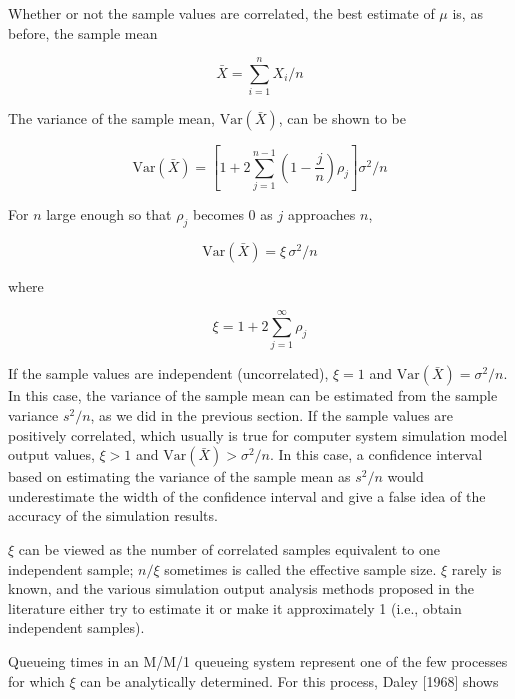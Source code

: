 Whether or not the sample values are correlated, the best estimate of $\mu$ is,
as before, the sample mean

\begin{equation}
\bar{X} = \sum_{i=1}^{n} X_i / n
\label{eq:output-mean-x}
\end{equation}

The variance of the sample mean, $\mathrm{Var}(\bar{X})$, can be shown to be

\begin{equation}
\mathrm{Var}(\bar{X}) =
\left[1 + 2 \sum_{j=1}^{n-1} \left(1 - \frac{j}{n}\right) \rho_j \right]
\sigma^2 / n
\label{eq:output-variance-mean}
\end{equation}

For $n$ large enough so that $\rho_j$ becomes 0 as $j$ approaches $n$,

\begin{equation}
\mathrm{Var}(\bar{X}) = \xi \, \sigma^2 / n
\label{eq:output-variance-mean-xi}
\end{equation}

where

\begin{equation}
\xi = 1 + 2 \sum_{j=1}^{\infty} \rho_j
\label{eq:output-xi}
\end{equation}

If the sample values are independent (uncorrelated), $\xi = 1$ and
$\mathrm{Var}(\bar{X}) = \sigma^2 / n$. In this case, the variance of the
sample mean can be estimated from the
sample variance $s^2/n$, as we did in the previous section. If the sample
values are positively correlated, which usually is true for computer system
simulation model output values, $\xi > 1$ and $\mathrm{Var}(\bar{X}) >
\sigma^2/n$. In this case, a confidence interval based on estimating the
variance of the sample mean as $s^2/n$ would underestimate the width of the
confidence interval and give a false idea of the accuracy of the simulation
results.

$\xi$ can be viewed as the number of correlated samples equivalent to one
independent sample; $n/\xi$ sometimes is called the effective sample size.
$\xi$ rarely is known, and the various simulation output analysis methods
proposed in the literature either try to estimate it or make it approximately
1 (i.e., obtain independent samples).

Queueing times in an M/M/1 queueing system represent one of the few processes
for which $\xi$ can be analytically determined. For this process, Daley
[1968] shows

